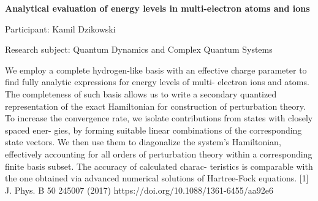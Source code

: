 \begin{minipage}[t]{1.0\textwidth}

\begin{center}

{{\large\bfseries Analytical evaluation of energy levels in multi-electron atoms and ions}\par}

\end{center}

{\noindent Participant: Kamil Dzikowski\par} 

{\noindent Research subject: Quantum Dynamics and Complex Quantum Systems\par}\medskip

\noindent We employ a complete hydrogen-like basis with an effective charge
parameter to find fully analytic expressions for energy levels of multi-
electron ions and atoms. The completeness of such basis allows us to
write a secondary quantized representation of the exact Hamiltonian
for construction of perturbation theory. To increase the convergence
rate, we isolate contributions from states with closely spaced ener-
gies, by forming suitable linear combinations of the corresponding state
vectors. We then use them to diagonalize the system’s Hamiltonian,
effectively accounting for all orders of perturbation theory within a
corresponding finite basis subset. The accuracy of calculated charac-
teristics is comparable with the one obtained via advanced numerical
solutions of Hartree-Fock equations. [1] J. Phys. B 50 245007 (2017)
https://doi.org/10.1088/1361-6455/aa92e6\par\end{minipage}

\hfill 


